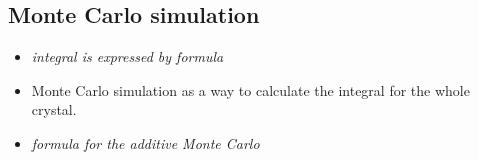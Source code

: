 \subsection{Monte Carlo simulation}
\label{subsec:monteCarlo}

\begin{itemize}

  \item \textit{integral is expressed by formula} \cite[Daniel's Thesis]{ASE2010}

  \item Monte Carlo simulation as a way to calculate the integral for the whole
    crystal.

  \item \textit{formula for the additive Monte Carlo}

\end{itemize}






